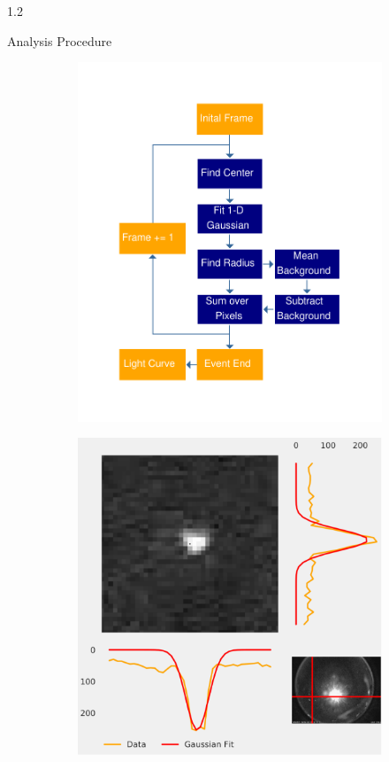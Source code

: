 \documentclass[final]{beamer}
\newlength{\twocolwid}
\begin{document}
\begin{frame}[t]
\begin{columns}[t]
\begin{column}{1.2\twocolwid}
\begin{alertblock}{Analysis Procedure}
\begin{figure}
\centering
\begin{subfigure}{.5\textwidth}
  \centering
  \includegraphics[width=\linewidth]{flowchart4.pdf}
  \label{fig:flowchart}
\end{subfigure}%
\begin{subfigure}{.5\textwidth}
  \centering
  \includegraphics[width=\linewidth]{testplot2.pdf}

\end{subfigure}
\end{figure}
\end{alertblock}
\end{column}
\end{columns}
\end{frame}
\end{document}
